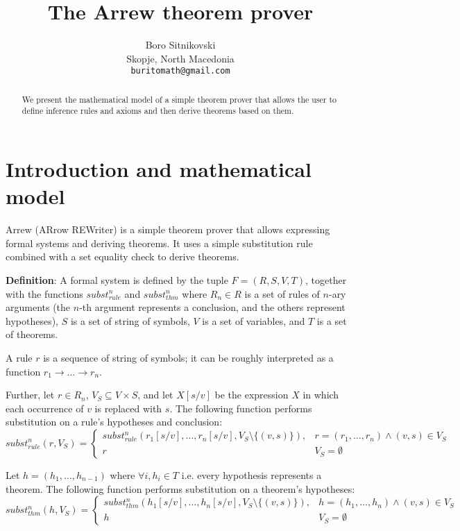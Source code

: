 \documentclass{article}
\title{The Arrew theorem prover}
\author{
  Boro Sitnikovski \\
  Skopje, North Macedonia \\
  \texttt{buritomath@gmail.com} \\
}
\begin{document}
\maketitle

\begin{abstract}
We present the mathematical model of a simple theorem prover that allows the user to define inference rules and axioms and then derive theorems based on them.
\end{abstract}


\section{Introduction and mathematical model}

Arrew (ARrow REWriter) is a simple theorem prover that allows expressing formal systems and deriving theorems. It uses a simple substitution rule combined with a set equality check to derive theorems.

\textbf{Definition}: A formal system is defined by the tuple $F = (R, S, V, T)$, together with the functions $subst_{rule}^n$ and $subst_{thm}^n$ where $R_n \in R$ is a set of rules of $n$-ary arguments (the $n$-th argument represents a conclusion, and the others represent hypotheses), $S$ is a set of string of symbols, $V$ is a set of variables, and $T$ is a set of theorems.

A rule $r$ is a sequence of string of symbols; it can be roughly interpreted as a function $r_1 \to \ldots \to r_n$.

Further, let $r \in R_n$, $V_S \subseteq V \times S$, and let $X[s/v]$ be the expression $X$ in which each occurrence of $v$ is replaced with $s$. The following function performs substitution on a rule's hypotheses and conclusion:
$$ subst_{rule}^n(r, V_S) = {
\begin{cases}
subst_{rule}^n(r_1[s/v], \ldots, r_n[s/v], V_S \setminus \{(v, s) \}), & r = (r_1, \ldots, r_n) \land (v, s) \in V_S \\
r & V_S = \emptyset
\end{cases}}
$$

Let $h = (h_1, \ldots, h_{n-1})$ where $\forall i, h_i \in T$ i.e. every hypothesis represents a theorem. The following function performs substitution on a theorem's hypotheses:
$$ subst_{thm}^n(h, V_S) = {
\begin{cases}
subst_{thm}^n(h_1[s/v], \ldots, h_n[s/v], V_S \setminus \{(v, s) \}), & h = (h_1, \ldots, h_n) \land (v, s) \in V_S \\
h & V_S = \emptyset
\end{cases}}
$$
\end{document}
